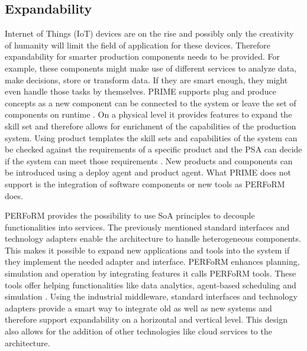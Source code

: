 \documentclass[conference,compsoc,hidelinks]{IEEEtran}
\begin{document}
\subsection{Expandability}
Internet of Things (IoT) devices are on the rise and possibly only the creativity of humanity will limit the field of application for these devices. Therefore expandability for smarter production components needs to be provided. For example, these components might make use of different services to analyze data, make decisions, store or transform data. If they are smart enough, they might even handle those tasks by themselves. PRIME supports plug and produce concepts as a new component can be connected to the system or leave the set of components on runtime \cite{Hybrid}. On a physical level it provides features to expand the skill set and therefore allows for enrichment of the capabilities of the production system. Using product templates the skill sets and capabilities of the system can be checked against the requirements of a specific product and the PSA can decide if the system can meet those requirements \cite{Hybrid}. New products and components can be introduced using a deploy agent and product agent. What PRIME does not support is the integration of software components or new tools as PERFoRM does.
 
PERFoRM provides the possibility to use SoA principles to decouple functionalities into services. The previously mentioned standard interfaces and technology adapters enable the architecture to handle heterogeneous components. This makes it possible to expand new applications and tools into the system if they implement the needed adapter and interface. 
PERFoRM enhances planning, simulation and operation by integrating features it calls PERFoRM tools. These tools offer helping functionalities like data analytics, agent-based scheduling and simulation \cite{SpecPERFoRM}.
Using the industrial middleware, standard interfaces and technology adapters provide a smart way to integrate old as well as new systems and therefore support expandability on a horizontal and vertical level. This design also allows for the addition of other technologies like cloud services to the architecture.
\end{document}
